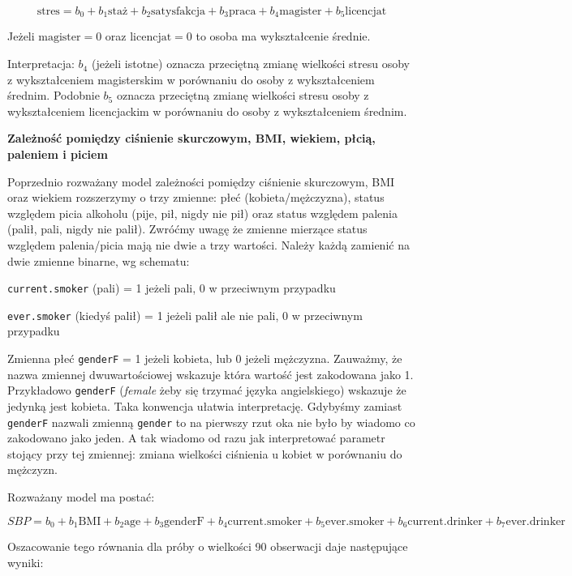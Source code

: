 \documentclass[
  openany]{book}
\begin{document}
\[\textrm{stres} = b_0 + b_1\textrm{staż} + b_2 \textrm{satysfakcja} + b_3 \textrm{praca}
+ b_4 \textrm{magister} + b_5 \textrm{licencjat} \]

Jeżeli \(\textrm{magister} = 0\) oraz \(\textrm{licencjat} = 0\) to osoba ma wykształcenie średnie.

Interpretacja: \(b_4\) (jeżeli istotne) oznacza przeciętną zmianę wielkości stresu osoby z wykształceniem magisterskim w porównaniu do osoby z wykształceniem średnim. Podobnie \(b_5\) oznacza przeciętną zmianę
wielkości stresu osoby z wykształceniem licencjackim
w porównaniu do osoby z wykształceniem średnim.

\begin{example}
\textbf{Zależność pomiędzy ciśnienie skurczowym, BMI, wiekiem, płcią, paleniem i piciem}

Poprzednio rozważany model zależności pomiędzy ciśnienie skurczowym, BMI oraz wiekiem
rozszerzymy o trzy zmienne: płeć (kobieta/mężczyzna),
status względem picia alkoholu (pije, pił, nigdy nie pił)
oraz status względem palenia (palił, pali, nigdy nie palił).
Zwróćmy uwagę że zmienne mierzące status względem palenia/picia mają nie dwie a trzy wartości.
Należy każdą zamienić na dwie zmienne binarne, wg schematu:

\texttt{current.smoker} (pali) = 1 jeżeli pali, 0 w przeciwnym przypadku

\texttt{ever.smoker} (kiedyś palił) = 1 jeżeli palił ale nie pali, 0 w przeciwnym przypadku

Zmienna płeć \texttt{genderF} = 1 jeżeli kobieta, lub 0 jeżeli mężczyzna. Zauważmy, że nazwa zmiennej
dwuwartościowej wskazuje która wartość jest zakodowana jako 1. Przykładowo \texttt{genderF} (\emph{female} żeby się
trzymać języka angielskiego) wskazuje że jedynką jest kobieta.
Taka konwencja ułatwia interpretację. Gdybyśmy zamiast \texttt{genderF} nazwali zmienną \texttt{gender} to na pierwszy
rzut oka nie było by wiadomo co zakodowano jako jeden. A tak wiadomo od razu jak
interpretować parametr stojący przy tej zmiennej: zmiana wielkości ciśnienia u kobiet w porównaniu do mężczyzn.

Rozważany model ma postać:

\[SBP = b_0 + b_1 \textrm{BMI} + b_2 \textrm{age} + b_3 \textrm{genderF} + 
b_4 \textrm{current.smoker} + b_5 \textrm{ever.smoker} + 
b_6 \textrm{current.drinker} + b_7 \textrm{ever.drinker}\]

Oszacowanie tego równania dla próby o wielkości 90 obserwacji daje następujące wyniki:


\end{example}
\end{document}
